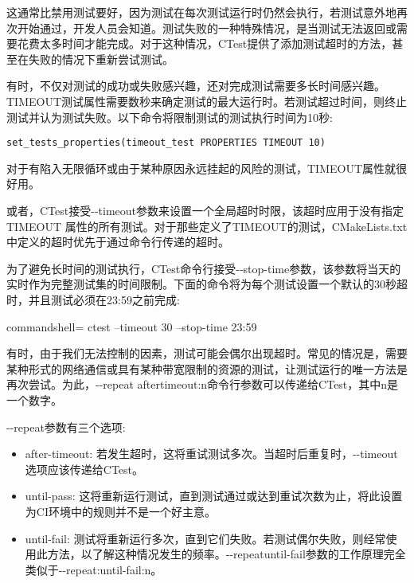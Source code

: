 这通常比禁用测试要好，因为测试在每次测试运行时仍然会执行，若测试意外地再次开始通过，开发人员会知道。测试失败的一种特殊情况，是当测试无法返回或需要花费太多时间才能完成。对于这种情况，CTest提供了添加测试超时的方法，甚至在失败的情况下重新尝试测试。


有时，不仅对测试的成功或失败感兴趣，还对完成测试需要多长时间感兴趣。TIMEOUT测试属性需要数秒来确定测试的最大运行时。若测试超过时间，则终止测试并认为测试失败。以下命令将限制测试的测试执行时间为10秒:

\begin{lstlisting}[style=styleCMake]
set_tests_properties(timeout_test PROPERTIES TIMEOUT 10)
\end{lstlisting}

对于有陷入无限循环或由于某种原因永远挂起的风险的测试，TIMEOUT属性就很好用。

或者，CTest接受-{}-timeout参数来设置一个全局超时时限，该超时应用于没有指定TIMEOUT 属性的所有测试。对于那些定义了TIMEOUT的测试，CMakeLists.txt中定义的超时优先于通过命令行传递的超时。

为了避免长时间的测试执行，CTest命令行接受-{}-stop-time参数，该参数将当天的实时作为完整测试集的时间限制。下面的命令将为每个测试设置一个默认的30秒超时，并且测试必须在23:59之前完成:

\begin{tcblisting}{commandshell={}}
ctest --timeout 30 --stop-time 23:59
\end{tcblisting}

有时，由于我们无法控制的因素，测试可能会偶尔出现超时。常见的情况是，需要某种形式的网络通信或具有某种带宽限制的资源的测试，让测试运行的唯一方法是再次尝试。为此，-{}-repeat aftertimeout:n命令行参数可以传递给CTest，其中n是一个数字。

-{}-repeat参数有三个选项:

\begin{itemize}
\item 
after-timeout: 若发生超时，这将重试测试多次。当超时后重复时，-{}-timeout选项应该传递给CTest。

\item 
until-pass: 这将重新运行测试，直到测试通过或达到重试次数为止，将此设置为CI环境中的规则并不是一个好主意。

\item 
until-fail: 测试将重新运行多次，直到它们失败。若测试偶尔失败，则经常使用此方法，以了解这种情况发生的频率。-{}-repeatuntil-fail参数的工作原理完全类似于-{}-repeat:until-fail:n。
\end{itemize}

